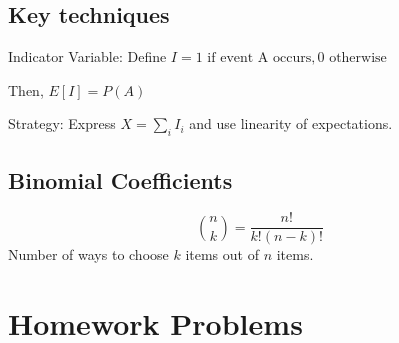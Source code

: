 \documentclass{report}
\begin{document}
\subsection{Key techniques} 

Indicator Variable: Define $I = 1 \text{ if event A occurs}, 0 \text{ otherwise}$
 

Then, $E[I] = P(A)$ 

Strategy: Express $X = \sum_i I_i$ and use linearity of expectations.

\subsection{Binomial Coefficients} 

\begin{equation}\binom{n}{k} = \frac{n!}{k!(n-k)!}\end{equation}
Number of ways to choose $k$ items out of $n$ items. 


\section{Homework Problems} 
\end{document}
